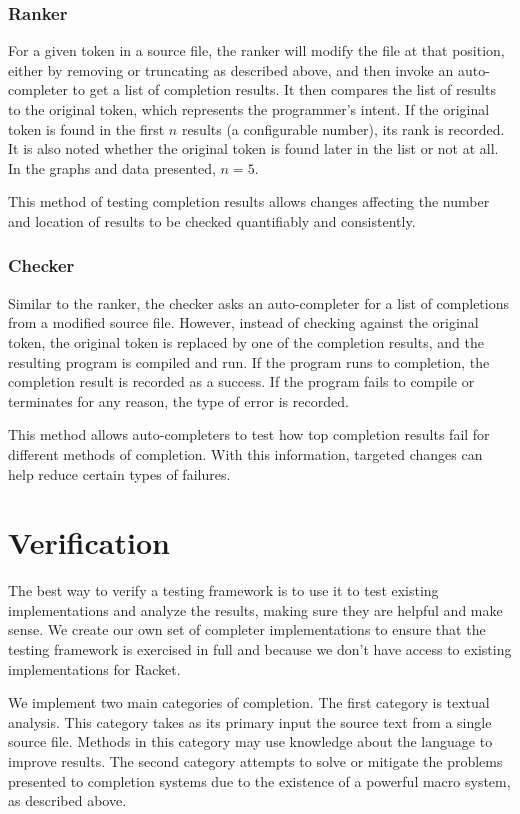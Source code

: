 \documentclass[ms,electronic,twosidetoc,letterpaper,chaptercenter,parttop,lol,lof,lot]{byumsphd}
\begin{document}
\subsection*{Ranker}

For a given token in a source file, the ranker will modify the file at that position, either by removing or truncating as described above, and then invoke an auto-completer to get a list of completion results.
It then compares the list of results to the original token, which represents the programmer's intent.
If the original token is found in the first $n$ results (a configurable number), its rank is recorded.
It is also noted whether the original token is found later in the list or not at all.
In the graphs and data presented, $n = 5$.

This method of testing completion results allows changes affecting the number and location of results to be checked quantifiably and consistently.

\subsection*{Checker}

Similar to the ranker, the checker asks an auto-completer for a list of completions from a modified source file.
However, instead of checking against the original token, the original token is replaced by one of the completion results, and the resulting program is compiled and run.
If the program runs to completion, the completion result is recorded as a success.
If the program fails to compile or terminates for any reason, the type of error is recorded.

This method allows auto-completers to test how top completion results fail for different methods of completion.
With this information, targeted changes can help reduce certain types of failures.

\chapter{Verification}

The best way to verify a testing framework is to use it to test existing implementations and analyze the results, making sure they are helpful and make sense.
We create our own set of completer implementations to ensure that the testing framework is exercised in full and because we don't have access to existing implementations for Racket.

We implement two main categories of completion.
The first category is textual analysis.
This category takes as its primary input the source text from a single source file.
Methods in this category may use knowledge about the language to improve results.
The second category attempts to solve or mitigate the problems presented to completion systems due to the existence of a powerful macro system, as described above.
\end{document}
